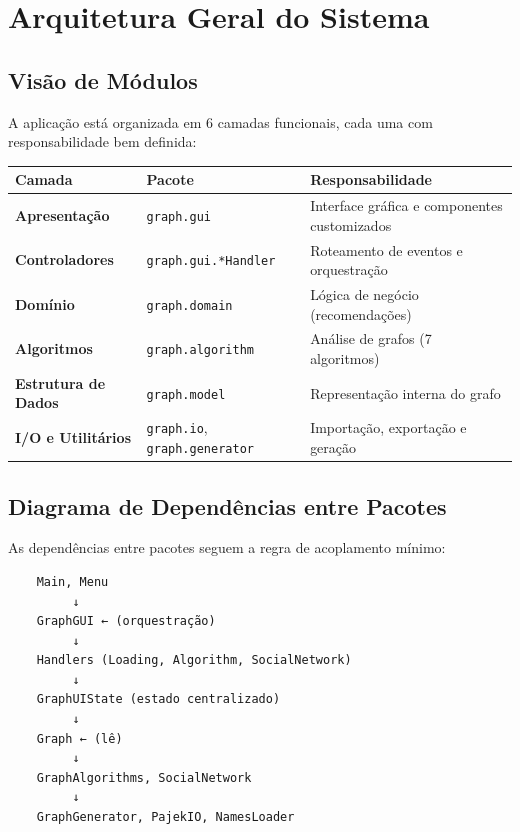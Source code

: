 \documentclass[12pt,a4paper]{article}
\begin{document}
\newpage

\section{Arquitetura Geral do Sistema}

\subsection{Visão de Módulos}

A aplicação está organizada em 6 camadas funcionais, cada uma com responsabilidade bem definida:

\begin{table}[h]
\centering
\begin{tabular}{|l|l|l|}
\hline
\textbf{Camada} & \textbf{Pacote} & \textbf{Responsabilidade} \\
\hline
\textbf{Apresentação} & \texttt{graph.gui} & Interface gráfica e componentes customizados \\
\hline
\textbf{Controladores} & \texttt{graph.gui.*Handler} & Roteamento de eventos e orquestração \\
\hline
\textbf{Domínio} & \texttt{graph.domain} & Lógica de negócio (recomendações) \\
\hline
\textbf{Algoritmos} & \texttt{graph.algorithm} & Análise de grafos (7 algoritmos) \\
\hline
\textbf{Estrutura de Dados} & \texttt{graph.model} & Representação interna do grafo \\
\hline
\textbf{I/O e Utilitários} & \texttt{graph.io}, \texttt{graph.generator} & Importação, exportação e geração \\
\hline
\end{tabular}
\end{table}

\subsection{Diagrama de Dependências entre Pacotes}

As dependências entre pacotes seguem a regra de acoplamento mínimo:

\begin{verbatim}
    Main, Menu
         ↓
    GraphGUI ← (orquestração)
         ↓
    Handlers (Loading, Algorithm, SocialNetwork)
         ↓
    GraphUIState (estado centralizado)
         ↓
    Graph ← (lê)
         ↓
    GraphAlgorithms, SocialNetwork
         ↓
    GraphGenerator, PajekIO, NamesLoader
\end{verbatim}
\end{document}

